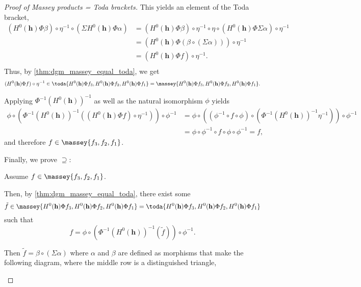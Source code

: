 \begin{proof}[Proof of Massey products = Toda brackets]
    This yields an element of the Toda bracket,
    \begin{align*}
        (H^0(\mathbf{h}) \Phi \beta) \circ \eta^{-1} \circ (\Sigma H^0(\mathbf{h}) \Phi \alpha) &= (H^0(\mathbf{h}) \Phi \beta) \circ \eta^{-1} \circ \eta \circ (H^0(\mathbf{h}) \Phi \Sigma \alpha) \circ \eta^{-1} \\
        &= (H^0(\mathbf{h}) \Phi (\beta \circ (\Sigma \alpha))) \circ \eta^{-1} \\
        &= (H^0(\mathbf{h}) \Phi f ) \circ \eta^{-1}. \\
    \end{align*}
    Thus, by \autoref{thm:dgm_massey_equal_toda}, we get
    \[
        (H^0(\mathbf{h}) \Phi f ) \circ \eta^{-1} \in \toda{H^0(\mathbf{h}) \Phi f_3, H^0(\mathbf{h}) \Phi f_2, H^0(\mathbf{h}) \Phi f_1} = \massey{H^0(\mathbf{h}) \Phi f_3, H^0(\mathbf{h}) \Phi f_2, H^0(\mathbf{h}) \Phi f_1}.
    \]

    Applying \( \Phi^{-1} (H^0(\mathbf{h}))^{-1} \) as well as the natural isomorphism \( \phi \) yields
    \begin{align*}
        \phi \circ (\Phi^{-1} (H^0(\mathbf{h}))^{-1} ((H^0(\mathbf{h}) \Phi f ) \circ \eta^{-1})) \circ \phi^{-1} &= \phi \circ ((\phi^{-1} \circ f \circ \phi) \circ (\Phi^{-1} (H^0(\mathbf{h}))^{-1} \eta^{-1})) \circ \phi^{-1} \\
        &= \phi \circ \phi^{-1} \circ f \circ \phi \circ \phi^{-1} = f,
    \end{align*}
    and therefore \( f \in \massey{f_3, f_2, f_1} \).

    Finally, we prove \( \supseteq \):

    Assume \( f \in \massey{f_3, f_2, f_1} \).

    Then, by \autoref{thm:dgm_massey_equal_toda}, there exist some
    \[
        \tilde{f} \in \massey{H^0(\mathbf{h}) \Phi f_3, H^0(\mathbf{h}) \Phi f_2, H^0(\mathbf{h}) \Phi f_1} = \toda{H^0(\mathbf{h}) \Phi f_3, H^0(\mathbf{h}) \Phi f_2, H^0(\mathbf{h}) \Phi f_1}
    \]
    such that
    \[
        f = \phi \circ (\Phi^{-1} (H^0(\mathbf{h}))^{-1} (\tilde{f})) \circ \phi^{-1}.
    \]

    Then \( \tilde{f} = \beta \circ (\Sigma \alpha) \) where \( \alpha \) and \( \beta \) are defined as morphisms that make the following diagram, where the middle row is a distinguished triangle,
    \begin{center}
\end{center}
\end{proof}
